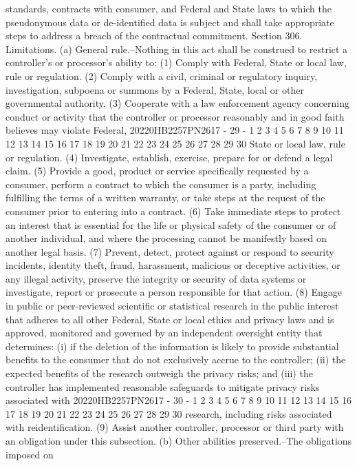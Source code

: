 standards, contracts with consumer, and Federal and State laws
to which the pseudonymous data or de-identified data is subject
and shall take appropriate steps to address a breach of the
contractual commitment.
Section 306. Limitations.
(a) General rule.--Nothing in this act shall be construed to
restrict a controller's or processor's ability to:
(1) Comply with Federal, State or local law, rule or
regulation.
(2) Comply with a civil, criminal or regulatory inquiry,
investigation, subpoena or summons by a Federal, State, local
or other governmental authority.
(3) Cooperate with a law enforcement agency concerning
conduct or activity that the controller or processor
reasonably and in good faith believes may violate Federal,
20220HB2257PN2617 - 29 -
1
2
3
4
5
6
7
8
9
10
11
12
13
14
15
16
17
18
19
20
21
22
23
24
25
26
27
28
29
30
State or local law, rule or regulation.
(4) Investigate, establish, exercise, prepare for or
defend a legal claim.
(5) Provide a good, product or service specifically
requested by a consumer, perform a contract to which the
consumer is a party, including fulfilling the terms of a
written warranty, or take steps at the request of the
consumer prior to entering into a contract.
(6) Take immediate steps to protect an interest that is
essential for the life or physical safety of the consumer or
of another individual, and where the processing cannot be
manifestly based on another legal basis.
(7) Prevent, detect, protect against or respond to
security incidents, identity theft, fraud, harassment,
malicious or deceptive activities, or any illegal activity,
preserve the integrity or security of data systems or
investigate, report or prosecute a person responsible for
that action.
(8) Engage in public or peer-reviewed scientific or
statistical research in the public interest that adheres to
all other Federal, State or local ethics and privacy laws and
is approved, monitored and governed by an independent
oversight entity that determines:
(i) if the deletion of the information is likely to
provide substantial benefits to the consumer that do not
exclusively accrue to the controller;
(ii) the expected benefits of the research outweigh
the privacy risks; and
(iii) the controller has implemented reasonable
safeguards to mitigate privacy risks associated with
20220HB2257PN2617 - 30 -
1
2
3
4
5
6
7
8
9
10
11
12
13
14
15
16
17
18
19
20
21
22
23
24
25
26
27
28
29
30
research, including risks associated with reidentification.
(9) Assist another controller, processor or third party
with an obligation under this subsection.
(b) Other abilities preserved.--The obligations imposed on
